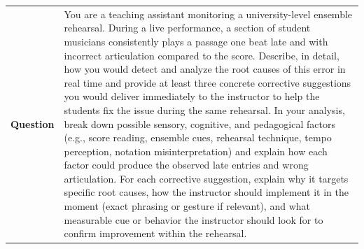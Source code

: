 \begin{longtable}{@{}l p{13cm}@{}}
  \textbf{Question}  & You are a teaching assistant monitoring a university-level ensemble rehearsal. During a live performance, a section of student musicians consistently plays a passage one beat late and with incorrect articulation compared to the score. Describe, in detail, how you would detect and analyze the root causes of this error in real time and provide at least three concrete corrective suggestions you would deliver immediately to the instructor to help the students fix the issue during the same rehearsal. In your analysis, break down possible sensory, cognitive, and pedagogical factors (e.g., score reading, ensemble cues, rehearsal technique, tempo perception, notation misinterpretation) and explain how each factor could produce the observed late entries and wrong articulation. For each corrective suggestion, explain why it targets specific root causes, how the instructor should implement it in the moment (exact phrasing or gesture if relevant), and what measurable cue or behavior the instructor should look for to confirm improvement within the rehearsal.   \\

\end{longtable}
